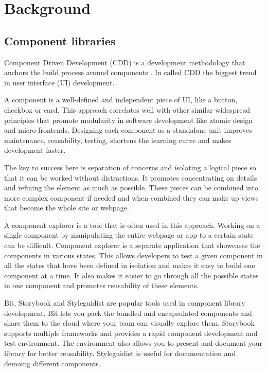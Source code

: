 \documentclass{master_thesis}
\begin{document}
\section{Background}



\subsection{Component libraries}

Component Driven Development (CDD) is a development methodology that anchors the build process around components \citep{Coleman2017}. In \citeyear{Coleman2017} \citeauthor{Coleman2017} called CDD the biggest trend in user interface (UI) development.

A component is a well-defined and independent piece of UI, like a button, checkbox or card. This approach correlates well with other similar widespread principles that promote modularity in software development like atomic design and micro-frontends. Designing each component as a standalone unit improves maintenance, reusability, testing, shortens the learning curve and makes development faster. \citep{Ella2019}

The key to success here is separation of concerns and isolating a logical piece so that it can be worked without distractions. It promotes concentrating on details and refining the element as much as possible. These pieces can be combined into more complex component if needed and when combined they can make up views that become the whole site or webpage.

A component explorer is a tool that is often used in this approach. Working on a single component by manipulating the entire webpage or app to a certain state can be difficult. Component explorer is a separate application that showcases the components in various states. This allows developers to test a given component in all the states that have been defined in isolation and makes it easy to build one component at a time. It also makes it easier to go through all the possible states in one component and promotes reusability of these elements. \citep{Coleman2017}

Bit, Storybook and Styleguidist are popular tools used in component library development. Bit lets you pack the bundled and encapsulated components and share them to the cloud where your team can visually explore them. Storybook supports multiple frameworks and provides a rapid component development and test environment. The environment also allows you to present and document your library for better reusability. Styleguidist is useful for documentation and demoing different components. \citep{Ella2019}
\end{document}
